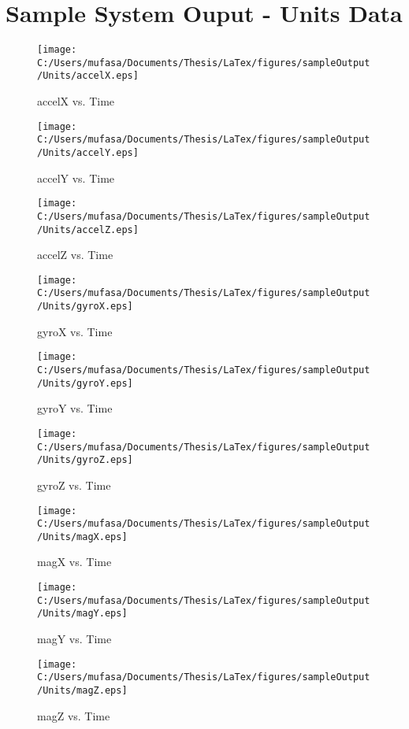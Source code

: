 \section{Sample System Ouput - Units Data}
\begin{figure}[H]
	\centering
	\caption{accelX vs. Time}
		\texttt{[image: C:/Users/mufasa/Documents/Thesis/LaTex/figures/sampleOutput/Units/accelX.eps]}
\end{figure}
\begin{figure}[H]
	\centering
	\caption{accelY vs. Time}
		\texttt{[image: C:/Users/mufasa/Documents/Thesis/LaTex/figures/sampleOutput/Units/accelY.eps]}
\end{figure}
\begin{figure}[H]
	\centering
	\caption{accelZ vs. Time}
		\texttt{[image: C:/Users/mufasa/Documents/Thesis/LaTex/figures/sampleOutput/Units/accelZ.eps]}
\end{figure}
\begin{figure}[H]
	\centering
	\caption{gyroX vs. Time}
		\texttt{[image: C:/Users/mufasa/Documents/Thesis/LaTex/figures/sampleOutput/Units/gyroX.eps]}
\end{figure}
\begin{figure}[H]
	\centering
	\caption{gyroY vs. Time}
		\texttt{[image: C:/Users/mufasa/Documents/Thesis/LaTex/figures/sampleOutput/Units/gyroY.eps]}
\end{figure}
\begin{figure}[H]
	\centering
	\caption{gyroZ vs. Time}
		\texttt{[image: C:/Users/mufasa/Documents/Thesis/LaTex/figures/sampleOutput/Units/gyroZ.eps]}
\end{figure}
\begin{figure}[H]
	\centering
	\caption{magX vs. Time}
		\texttt{[image: C:/Users/mufasa/Documents/Thesis/LaTex/figures/sampleOutput/Units/magX.eps]}
\end{figure}
\clearpage
\begin{figure}[H]
	\centering
	\caption{magY vs. Time}
		\texttt{[image: C:/Users/mufasa/Documents/Thesis/LaTex/figures/sampleOutput/Units/magY.eps]}
\end{figure}
\begin{figure}[H]
	\centering
	\caption{magZ vs. Time}
		\texttt{[image: C:/Users/mufasa/Documents/Thesis/LaTex/figures/sampleOutput/Units/magZ.eps]}
\end{figure}
